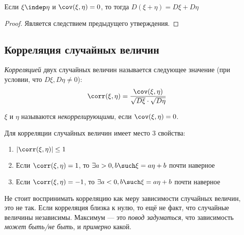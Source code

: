 \begin{proposition}
	Если $\xi \indep \eta$ и $\cov(\xi, \eta) = 0$, то тогда $D(\xi + \eta) = D\xi + D\eta$
\end{proposition}

\begin{proof}
	Является следствием предыдущего утверждения.
\end{proof}

\subsection{Корреляция случайных величин}

\begin{definition}
	\textit{Корреляцией} двух случайных величин называется следующее значение (при условии, что $D\xi, D\eta \neq 0$):
	\[
		\corr(\xi, \eta) = \frac{\cov(\xi, \eta)}{\sqrt{D\xi} \cdot \sqrt{D\eta}}
	\]
\end{definition}

\begin{definition}
	$\xi$ и $\eta$ называются \textit{некоррелирующими}, если $\cov(\xi, \eta) = 0$.
\end{definition}

\begin{theorem}
	Для корреляции случайных величин имеет место 3 свойства:
	\begin{enumerate}
		\item \(|\corr(\xi, \eta)| \le 1\)
		
		\item Если $\corr(\xi, \eta) = 1$, то $\exists a > 0, b \such \xi = a\eta + b$ почти наверное
		
		\item Если $\corr(\xi, \eta) = -1$, то $\exists a < 0, b \such \xi = a\eta + b$ почти наверное
	\end{enumerate}
\end{theorem}

\begin{note}
	Не стоит воспринимать корреляцию как меру зависимости случайных величин, это не так. Если корреляция близка к нулю, то ещё не факт, что случайные величины независимы. Максимум --- это \textit{повод задуматься}, что зависимость \textit{может быть/не быть}, и \textit{примерно} какой.
\end{note}

